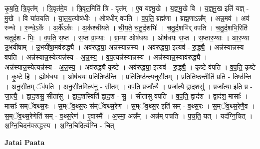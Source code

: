 \documentclass[17pt]{extarticle}
\begin{document}
कृ॒ष॒ति॒ त्रि॒वृत᳚म् । त्रि॒वृत॑मे॒व । त्रि॒वृत॒मिति॑ त्रि - वृत᳚म् । ए॒व य॑ज्ञ्मु॒खे । य॒ज्ञ्॒मु॒खे वि । य॒ज्ञ्॒मु॒ख इति॑ यज्ञ् - मु॒खे । वि या॑तयति । या॒त॒य॒त्योष॑धीः । ओष॑धीर् वपति । व॒प॒ति॒ ब्रह्म॑णा । ब्रह्म॒णाऽन्न᳚म् । अन्न॒मव॑ । अव॑ रुन्धे । रु॒न्धे॒ऽर्के । अ॒र्के᳚ऽर्कः । अ॒र्कश्ची॑यते । ची॒य॒ते॒ च॒तु॒र्द॒शभिः॑ । च॒तु॒र्द॒शभि॑र् वपति । च॒तु॒र्द॒शभि॒रिति॑ चतुर्द॒श - भिः॒ । व॒प॒ति॒ स॒प्त । स॒प्त ग्रा॒म्याः । ग्रा॒म्या ओष॑धयः । ओष॑धयः स॒प्त । स॒प्तार॒ण्याः । आ॒र॒ण्या उ॒भयी॑षाम् । उ॒भयी॑षा॒मव॑रुद्ध्यै । अव॑रुद्ध्या॒ अन्न॑स्यान्नस्य । अव॑रुद्ध्या॒ इत्यव॑ - रु॒द्ध्यै॒ । अन्न॑स्यान्नस्य वपति । अन्न॑स्यान्न॒स्येत्यन्न॑स्य - अ॒न्न॒स्य॒ । व॒प॒त्यन्न॑स्यान्नस्य । अन्न॑स्यान्न॒स्याव॑रुद्ध्यै । अन्न॑स्यान्न॒स्येत्यन्न॑स्य - अ॒न्न॒स्य॒ । अव॑रुद्ध्यै कृ॒ष्टे । अव॑रुद्ध्या॒ इत्यव॑ - रु॒द्ध्यै॒ । कृ॒ष्टे व॑पति । व॒प॒ति॒ कृ॒ष्टे । कृ॒ष्टे हि । ह्योष॑धयः । ओष॑धयः प्रति॒तिष्ठ॑न्ति । प्र॒ति॒तिष्ठ॑न्त्यनुसी॒तम् । प्र॒ति॒तिष्ठ॒न्तीति॑ प्रति - तिष्ठ॑न्ति । अ॒नु॒सी॒तम् ॅव॑पति । अ॒नु॒सी॒तमित्य॑नु - सी॒तम् । व॒प॒ति॒ प्रजा᳚त्यै । प्रजा᳚त्यै द्वाद॒शसु॑ । प्रजा᳚त्या॒ इति॒ प्र - जा॒त्यै॒ । द्वा॒द॒शसु॒ सीता॑सु । द्वा॒द॒शस्विति॑ द्वाद॒श - सु॒ । सीता॑सु वपति । व॒प॒ति॒ द्वाद॑श । द्वाद॑श॒ मासाः᳚ । मासाः᳚ सम्ॅवथ्स॒रः । स॒म्ॅव॒थ्स॒रः स॑म्ॅवथ्स॒रेण॑ । स॒म्ॅव॒थ्स॒र इति॑ सम् - व॒थ्स॒रः । स॒म्ॅव॒थ्स॒रेणै॒व । स॒म्ॅव॒थ्स॒रेणेति॑ सम् - व॒थ्स॒रेण॑ । ए॒वास्मै᳚ । अ॒स्मा॒ अन्न᳚म् । अन्न॑म् पचति । प॒च॒ति॒ यत् । यद॑ग्नि॒चित् । अ॒ग्नि॒चिदन॑वरुद्धस्य । अ॒ग्नि॒चिदित्य॑ग्नि - चित् \newline

\textbf{Jatai Paata} \newline
\end{document}
